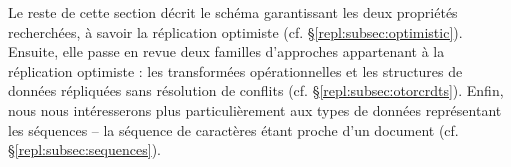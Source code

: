 Le reste de cette section décrit le schéma garantissant les deux propriétés
recherchées, à savoir la réplication optimiste (cf. §\ref{repl:subsec:optimistic}).
Ensuite, elle passe en revue deux familles d'approches appartenant à la
réplication optimiste : les transformées opérationnelles et les structures de
données répliquées sans résolution de conflits
(cf. §\ref{repl:subsec:otorcrdts}). Enfin, nous nous intéresserons plus
particulièrement aux types de données représentant les séquences -- la séquence
de caractères étant proche d'un document (cf. §\ref{repl:subsec:sequences}). 






